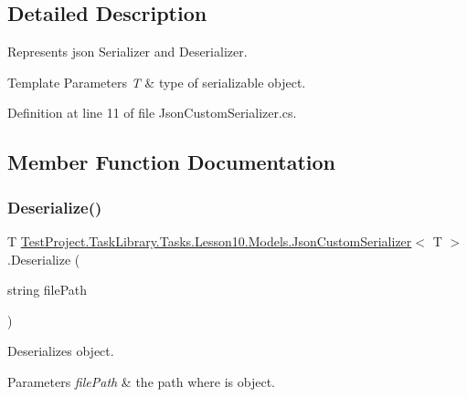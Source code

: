 \subsection{Detailed Description}
Represents json Serializer and Deserializer. 


\begin{DoxyTemplParams}{Template Parameters}
{\em T} & type of serializable object.\\
\hline
\end{DoxyTemplParams}


Definition at line 11 of file Json\+Custom\+Serializer.\+cs.



\subsection{Member Function Documentation}
\mbox{\label{class_test_project_1_1_task_library_1_1_tasks_1_1_lesson10_1_1_models_1_1_json_custom_serializer_ad6ab6bc444a855cc1baad8fd2c1a6b16}} 
\subsubsection{\texorpdfstring{Deserialize()}{Deserialize()}}
{\footnotesize\ttfamily T \mbox{\hyperlink{class_test_project_1_1_task_library_1_1_tasks_1_1_lesson10_1_1_models_1_1_json_custom_serializer}{Test\+Project.\+Task\+Library.\+Tasks.\+Lesson10.\+Models.\+Json\+Custom\+Serializer}}$<$ T $>$.Deserialize (\begin{DoxyParamCaption}\item[{string}]{file\+Path }\end{DoxyParamCaption})}



Deserializes object. 


\begin{DoxyParams}{Parameters}
{\em file\+Path} & the path where is object.\\
\hline
\end{DoxyParams}


